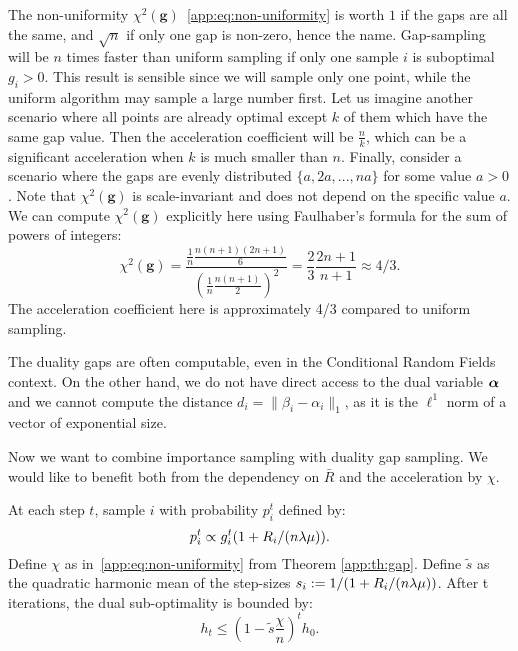 \begin{subappendices}
The non-uniformity $\chi^2(\bm g)$~\eqref{app:eq:non-uniformity} is worth $1$ if the gaps
are all the same, and $\sqrt n$ if only one gap is non-zero, hence the name.
Gap-sampling will be $n$ times faster than uniform sampling if only one sample $i$ is suboptimal $g_i>0$.
This result is sensible since we will sample only one point, while the uniform algorithm may sample a large number first.
Let us imagine another scenario where all points are already optimal except $k$ of them which have the same gap value.
Then the acceleration coefficient will be $\frac{n}{k}$, which can be a significant acceleration when $k$ is much smaller than $n$.
Finally, consider a scenario where the gaps are evenly distributed $\{a, 2a, ..., n a\}$ for some value $a > 0$.
Note that $\chi^2(\bm g)$ is scale-invariant and does not depend on the specific value $a$.
We can compute $\chi^2(\bm g)$ explicitly here using Faulhaber's formula for the sum of powers of integers:
\begin{equation*}
\chi^2(\bm g) = \frac{\frac{1}{n} \frac{n(n+1)(2n+1)}{6}}{\left(\frac{1}{n}\frac{n(n+1)}{2}\right)^2} = \frac{2}{3} \frac{2n+1}{n+1} \approx 4/3.
\end{equation*}
The acceleration coefficient here is approximately 4/3 compared to uniform sampling.

The duality gaps are often computable, even in the Conditional Random Fields context.
On the other hand, we do not have direct access to the dual variable $\boldsymbol{\alpha}$
and we cannot compute the distance $d_i = \| \beta_i - \alpha_i \|_1$, as it is the $\ell^1$ norm of a vector of exponential size.

Now we want to combine importance sampling with duality gap sampling.
We would like to benefit both from the dependency on $\bar R$ and the acceleration by $\chi$.

\begin{theorem}
	\label{app:th:gap+}
	At each step $t$, sample $i$ with probability $p_i^t$ defined by:
	\begin{equation}
		p_i^t \propto g_i^t (1+ R_i/(n \lambda \mu)).
	\end{equation}
	Define $\chi$ as in~\eqref{app:eq:non-uniformity} from Theorem \ref{app:th:gap}.
	Define $\tilde s$ as the quadratic harmonic mean of the step-sizes $s_i := 1/(1+ R_i/(n \lambda \mu))$.
	After t iterations, the dual sub-optimality is bounded by:
	\begin{equation}
		h_t \leq (1-\tilde s \frac{\chi}{n})^t  h_0.
	\end{equation}
\end{theorem}


\end{subappendices}
